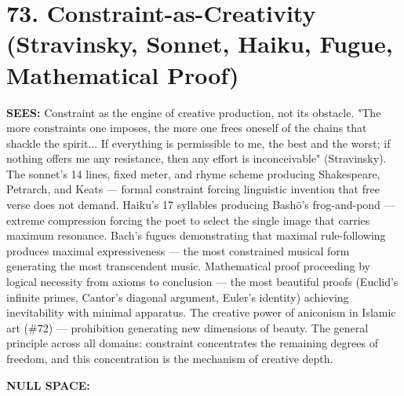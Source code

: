 \section*{73. Constraint-as-Creativity (Stravinsky, Sonnet, Haiku, Fugue, Mathematical Proof)}


\textbf{SEES:} Constraint as the engine of creative production, not its obstacle. "The more constraints one imposes, the more one frees oneself of the chains that shackle the spirit... If everything is permissible to me, the best and the worst; if nothing offers me any resistance, then any effort is inconceivable" (Stravinsky). The sonnet's 14 lines, fixed meter, and rhyme scheme producing Shakespeare, Petrarch, and Keats — formal constraint forcing linguistic invention that free verse does not demand. Haiku's 17 syllables producing Bashō's frog-and-pond — extreme compression forcing the poet to select the single image that carries maximum resonance. Bach's fugues demonstrating that maximal rule-following produces maximal expressiveness — the most constrained musical form generating the most transcendent music. Mathematical proof proceeding by logical necessity from axioms to conclusion — the most beautiful proofs (Euclid's infinite primes, Cantor's diagonal argument, Euler's identity) achieving inevitability with minimal apparatus. The creative power of aniconism in Islamic art (\#72) — prohibition generating new dimensions of beauty. The general principle across all domains: constraint concentrates the remaining degrees of freedom, and this concentration is the mechanism of creative depth.


\textbf{NULL SPACE:}

